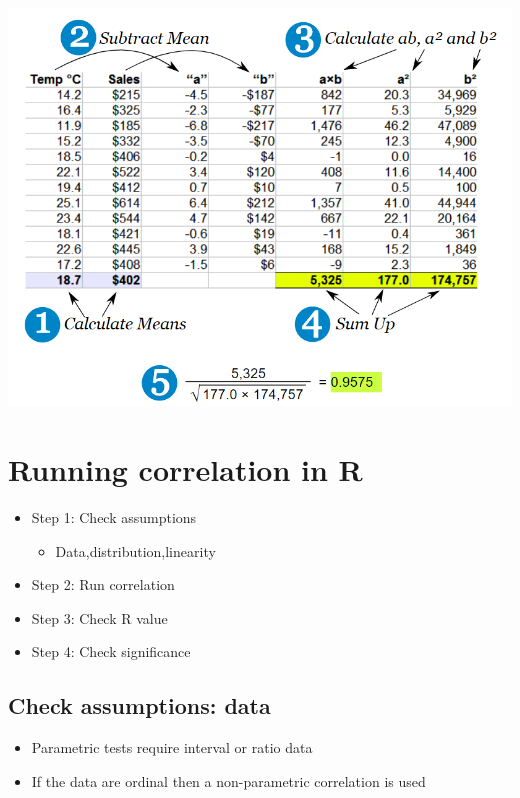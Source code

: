 \documentclass[
]{book}
\providecommand{\tightlist}{%
  \setlength{\itemsep}{0pt}\setlength{\parskip}{0pt}}
\begin{document}
\begin{center}\includegraphics[width=11.32in,height=1\textheight]{img/corcalc} \end{center}

\hypertarget{running-correlation-in-r}{%
\section{Running correlation in R}\label{running-correlation-in-r}}

\begin{itemize}
\tightlist
\item
  Step 1: Check assumptions

  \begin{itemize}
  \tightlist
  \item
    Data,distribution,linearity
  \end{itemize}
\item
  Step 2: Run correlation
\item
  Step 3: Check R value
\item
  Step 4: Check significance
\end{itemize}

\hypertarget{check-assumptions-data}{%
\subsection{Check assumptions: data}\label{check-assumptions-data}}

\begin{itemize}
\tightlist
\item
  Parametric tests require interval or ratio data
\item
  If the data are ordinal then a non-parametric correlation is used
\end{itemize}
\end{document}
